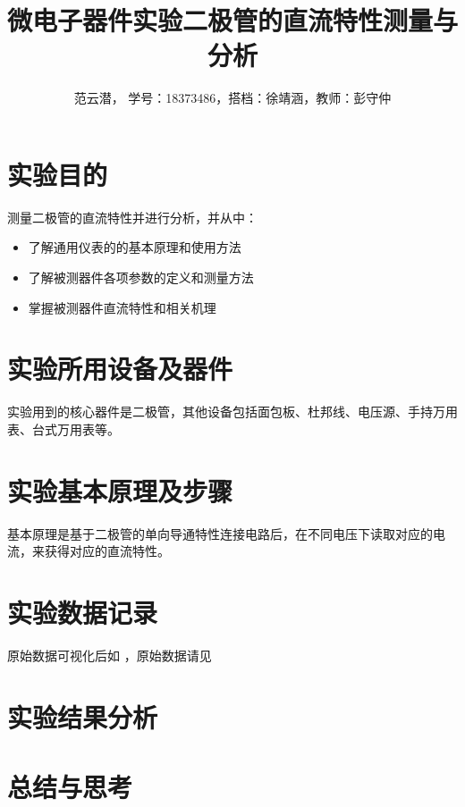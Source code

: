 \documentclass[lang=cn,11pt,a4paper,cite=authoryear]{elegantpaper}
\title{微电子器件实验\quad 二极管的直流特性测量与分析}
\author{范云潜， 学号：18373486，搭档：徐靖涵，教师：彭守仲}
\institute{微电子学院 184111 班}
\date{\zhdate{2020/10/19}}
\begin{document}
\maketitle


\section{实验目的}

测量二极管的直流特性并进行分析，并从中：

\begin{itemize}
    \item 了解通用仪表的的基本原理和使用方法
    \item 了解被测器件各项参数的定义和测量方法
    \item 掌握被测器件直流特性和相关机理
\end{itemize}

\section{实验所用设备及器件}

实验用到的核心器件是二极管，其他设备包括面包板、杜邦线、电压源、手持万用表、台式万用表等。

\section{实验基本原理及步骤}

基本原理是基于二极管的单向导通特性连接电路后，在不同电压下读取对应的电流，来获得对应的直流特性。

\section{实验数据记录}

原始数据可视化后如  ，原始数据请见


\section{实验结果分析}

\section{总结与思考}


\end{document}
